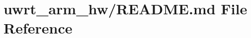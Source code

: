 \hypertarget{uwrt__arm__hw_2_r_e_a_d_m_e_8md}{}\section{uwrt\+\_\+arm\+\_\+hw/\+R\+E\+A\+D\+ME.md File Reference}
\label{uwrt__arm__hw_2_r_e_a_d_m_e_8md}
